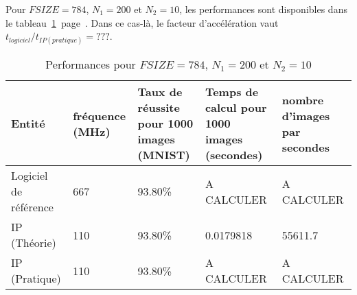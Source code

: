 Pour $FSIZE = 784$, $N_1 = 200$ et $N_2 = 10$, les performances sont disponibles
dans le tableau~\ref{fig:perf_200}~page~\pageref{fig:perf_200}.
Dans ce cas-là, le facteur d'accélération vaut $t_{logiciel}/t_{IP (pratique)} = ???$.\\
\begin{table}[h!]
	\centering
	\begin{tabular}{| p{} | p{} | p{} | p{} | p{} |}
	\hline
	Entité & fréquence (MHz) & Taux de réussite pour 1000 images (MNIST) & Temps de calcul pour 1000 images (secondes) & nombre d'images par secondes\\
	\hline
	Logiciel de référence & 667 & 93.80\% & A CALCULER & A CALCULER\\
	IP (Théorie) & 110 & 93.80\% & 0.0179818 & 55611.7\\
	IP (Pratique) & 110 & 93.80\% & A CALCULER & A CALCULER\\
	\hline
\end{tabular}
\caption{Performances pour $FSIZE = 784$, $N_1 = 200$ et $N_2 = 10$}
\label{fig:perf_200}
\end{table}
